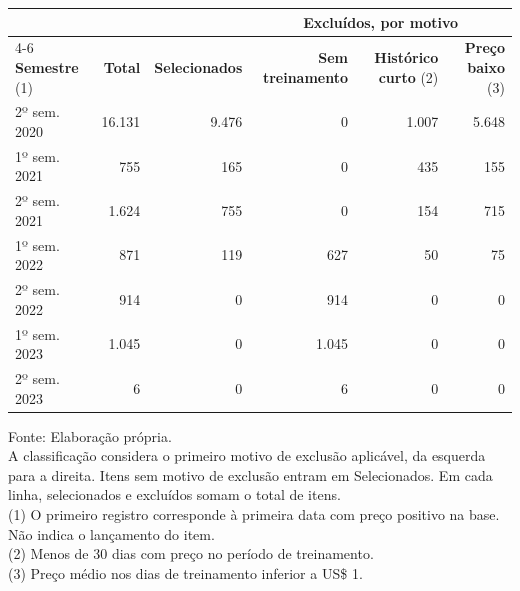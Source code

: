 \begingroup
\setlength{}
\setlength{}
\fontsize{9.5pt}{11.4pt}\selectfont

\setlength{\LTpost}{0mm}
\begin{longtable}{@{\extracolsep{\fill}}lrrrrr}

\toprule
 &  &  & \multicolumn{3}{c}{\textbf{Excluídos, por motivo}} \\ 
\cmidrule(lr){4-6}
\textbf{Semestre} (1) & \textbf{Total} & \textbf{Selecionados} & \textbf{Sem treinamento} & \textbf{Histórico curto} (2) & \textbf{Preço baixo} (3) \\ 
\midrule\addlinespace[2.5pt]
2º sem. 2020 & 16.131 & 9.476 & 0 & 1.007 & 5.648 \\
1º sem. 2021 & 755 & 165 & 0 & 435 & 155 \\
2º sem. 2021 & 1.624 & 755 & 0 & 154 & 715 \\
1º sem. 2022 & 871 & 119 & 627 & 50 & 75 \\
2º sem. 2022 & 914 & 0 & 914 & 0 & 0 \\
1º sem. 2023 & 1.045 & 0 & 1.045 & 0 & 0 \\
2º sem. 2023 & 6 & 0 & 6 & 0 & 0 \\
\bottomrule
\end{longtable}
\begin{minipage}{\linewidth}
Fonte: Elaboração própria.\\
A classificação considera o primeiro motivo de exclusão aplicável, da esquerda para a direita. Itens sem motivo de exclusão entram em Selecionados. Em cada linha, selecionados e excluídos somam o total de itens.\\
(1) O primeiro registro corresponde à primeira data com preço positivo na base. Não indica o lançamento do item.\\
(2) Menos de 30 dias com preço no período de treinamento.\\
(3) Preço médio nos dias de treinamento inferior a US\$ 1.\\
\end{minipage}
\endgroup
